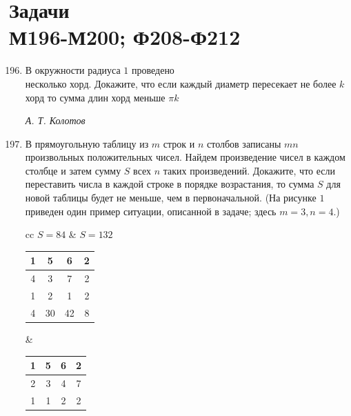 \section*{Задачи \\ М196-М200; Ф208-Ф212}

 \begin{enumerate}[label={М}{{\arabic*}}{.}, font=\bfseries, wide,  labelindent=0pt, noitemsep]
    \setcounter{enumi}{195}
    \item В окружности радиуса $1$ проведено \\ несколько хорд. Докажите, что если каждый диаметр пересекает не более $k$ хорд то сумма длин хорд меньше $\pi k$ 

    \begin{flushright}
        \textit{А. Т. Колотов}
    \end{flushright}
    
    \item В прямоугольную таблицу из $m$ строк и $n$ столбов записаны $mn$ произвольных положительных чисел. Найдем произведение чисел в каждом столбце и затем сумму $S$ всех $n$ таких произведений. Докажите, что если переставить числа в каждой строке в порядке возрастания, то сумма $S$ для новой таблицы будет не меньше, чем в первоначальной. (На рисунке $1$ приведен один пример ситуации, описанной в задаче; здесь $m = 3, n = 4$.) \par
    \begin{tabular}{ cc }   %
$S = 84$ & $S = 132$ \\  
\begin{tabular}{ |c|c|c|c| } 
 \hline
 1 & 5 & 6 & 2\\
 \hline
 4 & 3 & 7 & 2\\
 \hline
 1 & 2 & 1 & 2\\
 \hline
  
 \hline
 4 & 30 & 42 & 8\\
 \hline
\end{tabular} &  %
\begin{tabular}{ |c|c|c|c| } 
 \hline
 1 & 5 & 6 & 2\\
 \hline
 2 & 3 & 4 & 7\\
 \hline
 1 & 1 & 2 & 2\\
 \hline
  

\end{tabular}
\end{tabular}
\end{enumerate}

